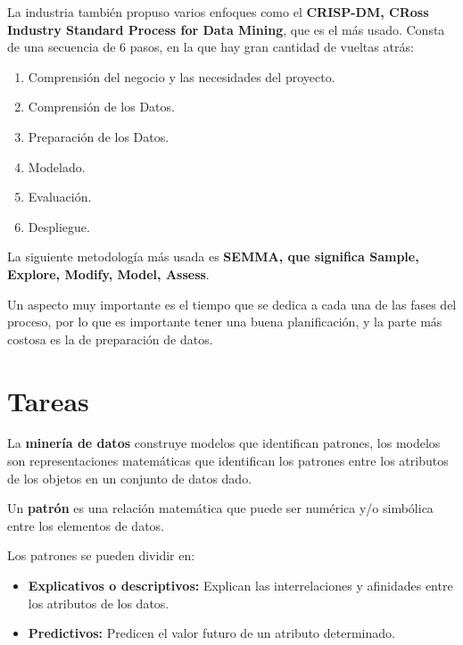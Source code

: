 \documentclass[12pt, twoside, openright]{report} %
\begin{document}
La industria también propuso varios enfoques como el \textbf{CRISP-DM, CRoss Industry Standard Process for Data Mining}, que es el más usado. Consta de una secuencia de 6 pasos, en la que hay gran cantidad de vueltas atrás:
\begin{enumerate}
	\item Comprensión del negocio y las necesidades del proyecto.
	\item Comprensión de los Datos.
	\item Preparación de los Datos.
	\item Modelado.
	\item Evaluación.
	\item Despliegue.
\end{enumerate}

La siguiente metodología más usada es \textbf{SEMMA, que significa Sample, Explore, Modify, Model, Assess}.

Un aspecto muy importante es el tiempo que se dedica a cada una de las fases del proceso, por lo que es importante tener una buena planificación, y la parte más costosa es la de preparación de datos.
\section{Tareas}
La  \textbf{minería de datos} construye modelos que identifican patrones, los modelos son representaciones matemáticas que identifican los patrones entre los atributos de los objetos en un conjunto de datos dado.

Un  \textbf{patrón} es una relación matemática que puede ser numérica y/o simbólica entre los elementos de datos.

Los patrones se pueden dividir en:
\begin{itemize}
	\item \textbf{Explicativos o descriptivos:} Explican las interrelaciones y afinidades entre los atributos de los datos.
	\item \textbf{Predictivos:} Predicen el valor futuro de un atributo determinado.
\end{itemize}
\end{document}
